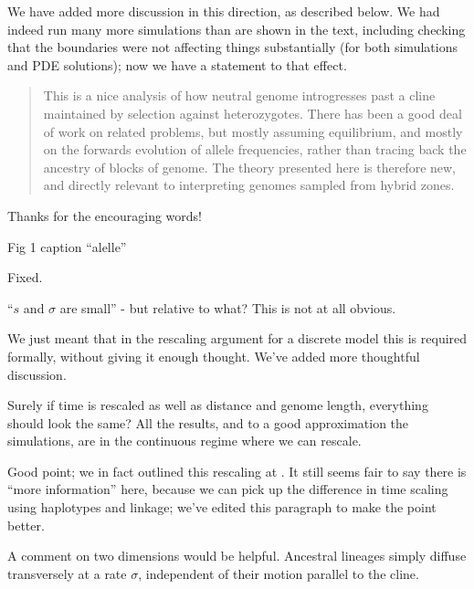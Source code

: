 We have added more discussion in this direction, as described below.
We had indeed run many more simulations than are shown in the text,
including checking that the boundaries were not affecting things substantially (for both simulations and PDE solutions);
now we have a statement to that effect.

\begin{quote}
This is a nice analysis of how neutral genome introgresses past a cline maintained by selection against heterozygotes.  There has been a good deal of work on related problems, but mostly assuming equilibrium, and mostly on the forwards evolution of allele frequencies, rather than tracing back the ancestry of blocks of genome.  The theory presented here is therefore new, and directly relevant to interpreting genomes sampled from hybrid zones.
\end{quote}

Thanks for the encouraging words!

\begin{point}{Fig 1 caption}
``alelle''
\end{point}

\reply
Fixed.

\begin{point}{\revref}
``$s$ and $\sigma$ are small'' - but relative to what?  This is not at all obvious.
\end{point}

\reply
We just meant that in the rescaling argument for a discrete model this is required formally,
without giving it enough thought.
We've added more thoughtful discussion.

\begin{point}{\revref}
Surely if time is rescaled as well as distance and genome length, everything should look the same?  
All the results, and to a good approximation the simulations, are in the continuous regime where we can rescale.
\end{point}

\reply
Good point; we in fact outlined this rescaling at .
It still seems fair to say there is ``more information'' here, because we can pick up the difference in time scaling
using haplotypes and linkage;
we've edited this paragraph to make the point better.

\begin{point}{}
A comment on two dimensions would be helpful.  
Ancestral lineages simply diffuse transversely at a rate $\sigma$, independent of their motion parallel to the cline.
\end{point}

